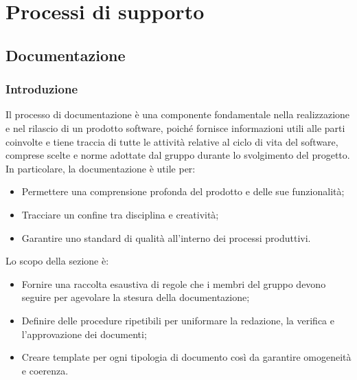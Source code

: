 \section{Processi di supporto}

\subsection{Documentazione}
\subsubsection{Introduzione}
Il processo di documentazione è una componente fondamentale nella realizzazione e nel rilascio di un prodotto software,
poiché fornisce informazioni utili alle parti coinvolte e tiene traccia di tutte le attività relative al ciclo di vita del software,
comprese scelte e norme adottate dal gruppo durante lo svolgimento del progetto. In particolare, la documentazione è utile per:
\begin{itemize}
	\item Permettere una comprensione profonda del prodotto e delle sue funzionalità;
	\item Tracciare un confine tra disciplina e creatività;
	\item Garantire uno standard di qualità all'interno dei processi produttivi.
\end{itemize}
Lo scopo della sezione è:
\begin{itemize}
	\item Fornire una raccolta esaustiva di regole che i membri del gruppo devono seguire per agevolare la stesura della documentazione;
	\item Definire delle procedure ripetibili per uniformare la redazione, la verifica e l'approvazione dei documenti;
	\item Creare template per ogni tipologia di documento così da garantire omogeneità e coerenza.
\end{itemize}

